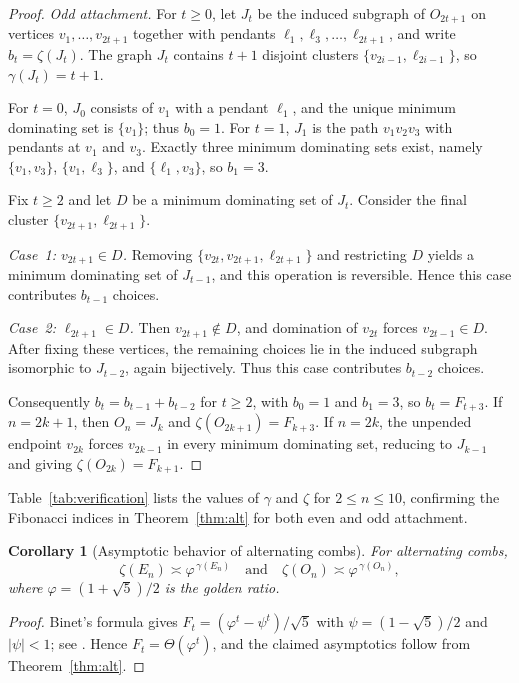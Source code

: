 \documentclass[11pt]{article}
\newtheorem{corollary}[theorem]{Corollary}
\theoremstyle{definition}
\theoremstyle{remark}
\newcommand{\gam}{\gamma}
\newcommand{\zet}{\zeta}
\begin{document}
\begin{proof}
\smallskip
\noindent\emph{Odd attachment.}
For $t\ge 0$, let $J_t$ be the induced subgraph of $O_{2t+1}$ on vertices
$v_1,\dots,v_{2t+1}$ together with pendants $\ell_1,\ell_3,\dots,\ell_{2t+1}$,
and write $b_t=\zeta(J_t)$.
The graph $J_t$ contains $t+1$ disjoint clusters
$\{v_{2i-1},\ell_{2i-1}\}$, so $\gamma(J_t)=t+1$.

For $t=0$, $J_0$ consists of $v_1$ with a pendant $\ell_1$, and the unique minimum
dominating set is $\{v_1\}$; thus $b_0=1$.
For $t=1$, $J_1$ is the path $v_1v_2v_3$ with pendants at $v_1$ and $v_3$.
Exactly three minimum dominating sets exist, namely
$\{v_1,v_3\}$, $\{v_1,\ell_3\}$, and $\{\ell_1,v_3\}$, so $b_1=3$.

Fix $t\ge 2$ and let $D$ be a minimum dominating set of $J_t$.
Consider the final cluster $\{v_{2t+1},\ell_{2t+1}\}$.

\emph{Case~1: $v_{2t+1}\in D$.}
Removing $\{v_{2t},v_{2t+1},\ell_{2t+1}\}$ and restricting $D$ yields a minimum
dominating set of $J_{t-1}$, and this operation is reversible.
Hence this case contributes $b_{t-1}$ choices.

\emph{Case~2: $\ell_{2t+1}\in D$.}
Then $v_{2t+1}\notin D$, and domination of $v_{2t}$ forces $v_{2t-1}\in D$.
After fixing these vertices, the remaining choices lie in the induced subgraph
isomorphic to $J_{t-2}$, again bijectively.
Thus this case contributes $b_{t-2}$ choices.

Consequently $b_t=b_{t-1}+b_{t-2}$ for $t\ge 2$, with $b_0=1$ and $b_1=3$,
so $b_t=F_{t+3}$.
If $n=2k+1$, then $O_n=J_k$ and $\zeta(O_{2k+1})=F_{k+3}$.
If $n=2k$, the unpended endpoint $v_{2k}$ forces $v_{2k-1}$ in every minimum
dominating set, reducing to $J_{k-1}$ and giving $\zeta(O_{2k})=F_{k+1}$.
\end{proof}


Table~\ref{tab:verification} lists the values of $\gam$ and $\zet$ for $2\le n\le 10$,
confirming the Fibonacci indices in Theorem~\ref{thm:alt} for both even and odd attachment.

\begin{corollary}[Asymptotic behavior of alternating combs]\label{cor:phi}
For alternating combs,
\[
\zeta(E_n)\asymp \varphi^{\,\gamma(E_n)}
\quad\text{and}\quad
\zeta(O_n)\asymp \varphi^{\,\gamma(O_n)},
\]
where $\varphi=(1+\sqrt5)/2$ is the golden ratio.
\end{corollary}

\begin{proof}
Binet's formula gives $F_t=(\varphi^t-\psi^t)/\sqrt5$ with $\psi=(1-\sqrt5)/2$ and $|\psi|<1$; see
\cite[Ch.~6]{GrahamKnuthPatashnik1994}. Hence $F_t=\Theta(\varphi^t)$, and the claimed asymptotics follow
from Theorem~\ref{thm:alt}.
\end{proof}
\end{document}
